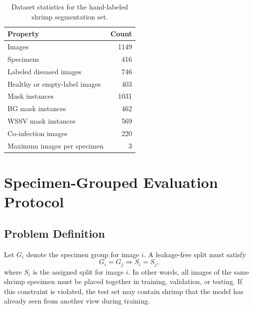 \documentclass{svproc}
\begin{document}
\begin{table}
\caption{Dataset statistics for the hand-labeled shrimp segmentation set.}
\label{tab:dataset_stats}
\begin{center}
\begin{tabular}{lr}
\hline
Property & Count \\
\hline
Images & 1149 \\
Specimens & 416 \\
Labeled diseased images & 746 \\
Healthy or empty-label images & 403 \\
Mask instances & 1031 \\
BG mask instances & 462 \\
WSSV mask instances & 569 \\
Co-infection images & 220 \\
Maximum images per specimen & 3 \\
\hline
\end{tabular}
\end{center}
\end{table}


\section{Specimen-Grouped Evaluation Protocol}

\subsection{Problem Definition}

Let $G_i$ denote the specimen group for image $i$. A leakage-free split
must satisfy
\begin{equation}
G_i = G_j \Rightarrow S_i = S_j,
\end{equation}
where $S_i$ is the assigned split for image $i$. In other words, all
images of the same shrimp specimen must be placed together in training,
validation, or testing. If this constraint is violated, the test set may
contain shrimp that the model has already seen from another view during
training.
\end{document}

